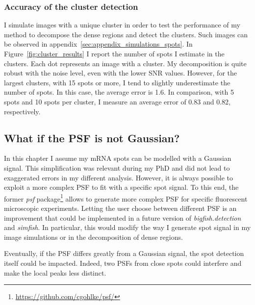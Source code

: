 \subsubsection{Accuracy of the cluster detection}

I simulate images with a unique cluster in order to test the performance of my method to decompose the dense regions and detect the clusters.
Such images can be observed in appendix~\ref{sec:appendix_simulations_spots}.
In Figure~\ref{fig:cluster_results} I report the number of spots I estimate in the clusters.
Each dot represents an image with a cluster.
My decomposition is quite robust with the noise level, even with the lower \ac{SNR} values.
However, for the largest clusters, with 15 spots or more, I tend to slightly underestimate the number of spots.
In this case, the average error is 1.6.
In comparison, with 5 spots and 10 spots per cluster, I measure an average error of 0.83 and 0.82, respectively.

\subsection{What if the PSF is not Gaussian?}
\label{subsec:psf}

In this chapter I assume my \ac{mRNA} spots can be modelled with a Gaussian signal.
This simplification was relevant during my PhD and did not lead to exaggerated errors in my different analysis.
However, it is always possible to exploit a more complex \ac{PSF} to fit with a specific spot signal.
To this end, the former \emph{psf} package\footnote{\url{https://github.com/cgohlke/psf/}} allows to generate more complex \ac{PSF} for specific fluorescent microscopic experiments.
Letting the user choose between different \ac{PSF} is an improvement that could be implemented in a future version of \emph{bigfish.detection} and \emph{simfish}.
In particular, this would modify the way I generate spot signal in my image simulations or in the decomposition of dense regions.

Eventually, if the \ac{PSF} differs greatly from a Gaussian signal, the spot detection itself could be impacted.
Indeed, two \ac{PSF}s from close spots could interfere and make the local peaks less distinct.

